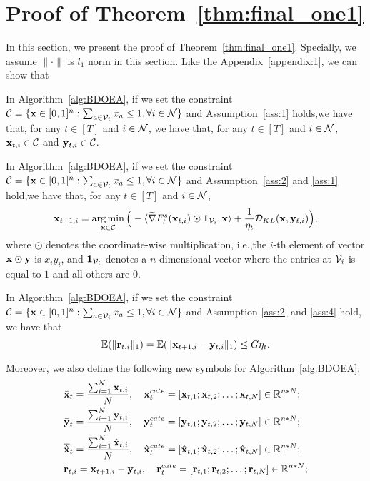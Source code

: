 	\section{Proof of Theorem~\ref{thm:final_one1}}\label{append:proof5}
In this  section, we  present the proof of Theorem~\ref{thm:final_one1}. Specially, we assume $\|\cdot\|$ is $l_{1}$ norm in this section.
Like the Appendix~\ref{appendix:1}, we can show that 
\begin{lemma}\label{lemma:included_convex_constaint2}
	In Algorithm~\ref{alg:BDOEA}, if we set the constraint $\mathcal{C}=\{\mathbf{x}\in[0,1]^{n}: \sum_{a\in\mathcal{V}_{i}}x_{a}\le1,\forall i\in\mathcal{N}\}$ and Assumption~\ref{ass:1} holds,we have that, for any $t\in[T]$ and $i\in\mathcal{N}$,  we have that, for any $t\in[T]$ and $i\in\mathcal{N}$, $\mathbf{x}_{t,i}\in\mathcal{C}$ and $\mathbf{y}_{t,i}\in\mathcal{C}$.
\end{lemma}
\begin{lemma}\label{lemma:simplify2}
	In Algorithm~\ref{alg:BDOEA}, if we set the constraint $\mathcal{C}=\{\mathbf{x}\in[0,1]^{n}: \sum_{a\in\mathcal{V}_{i}}x_{a}\le1,\forall i\in\mathcal{N}\}$ and Assumption~\ref{ass:2} and \ref{ass:1} hold,we have that, for any $t\in[T]$ and $i\in\mathcal{N}$, 
	\begin{equation*}
		\mathbf{x}_{t+1,i}=\mathop{\arg\min}_{\mathbf{x}\in\mathcal{C}}\Big(-\langle\widetilde{\nabla} F_{t}^{s}(\mathbf{x}_{t,i})\odot\mathbf{1}_{\mathcal{V}_{i}},\mathbf{x}\rangle+\frac{1}{\eta_{t}}\mathcal{D}_{KL}(\mathbf{x}, \mathbf{y}_{t,i})\Big), 
	\end{equation*}where $\odot$ denotes the coordinate-wise multiplication, i.e.,the $i$-th element of vector $\mathbf{x}\odot\mathbf{y}$ is $x_{i}y_{i}$, and $\mathbf{1}_{\mathcal{V}_{i}}$ denotes a $n$-dimensional vector where the entries at $\mathcal{V}_{i}$ is equal to $1$ and all others are $0$.
\end{lemma}
\begin{lemma}\label{lemma::2} In Algorithm~\ref{alg:BDOEA}, if we set the constraint $\mathcal{C}=\{\mathbf{x}\in[0,1]^{n}: \sum_{a\in\mathcal{V}_{i}}x_{a}\le1,\forall i\in\mathcal{N}\}$ and Assumption \ref{ass:2} and \ref{ass:4} hold, we have that
	\begin{equation*}
		\mathbb{E}(\|\mathbf{r}_{t,i}\|_{1})=\mathbb{E}(\|\mathbf{x}_{t+1,i}-\mathbf{y}_{t,i}\|_{1})\le G\eta_{t}.
	\end{equation*}
\end{lemma}
Moreover, we also define the following new symbols for Algorithm~\ref{alg:BDOEA}:
	\begin{equation*}
		\begin{aligned}
			&\bar{\x}_{t}=\frac{\sum_{i=1}^{N}\x_{t,i}}{N},\ \ \ \x_{t}^{cate}=[\x_{t,1};\x_{t,2};\dots;\x_{t,N}]\in\R^{n*N};\\
			&\bar{\y}_{t}=\frac{\sum_{i=1}^{N}\y_{t,i}}{N},\ \ \ \y_{t}^{cate}=[\y_{t,1};\y_{t,2};\dots;\y_{t,N}]\in\R^{n*N};\\
			&\overline{\hat{\x}}_{t}=\frac{\sum_{i=1}^{N}\hat{\x}_{t,i}}{N},\ \ \ \hat{\x}_{t}^{cate}=[\hat{\x}_{t,1};\hat{\x}_{t,2};\dots;\hat{\x}_{t,N}]\in\R^{n*N};\\
			&\mathbf{r}_{t,i}=\x_{t+1,i}-\y_{t,i},\ \ \ \mathbf{r}_{t}^{cate}=[\mathbf{r}_{t,1};\mathbf{r}_{t,2};\dots;\mathbf{r}_{t,N}]\in\R^{n*N};
		\end{aligned}
	\end{equation*}
